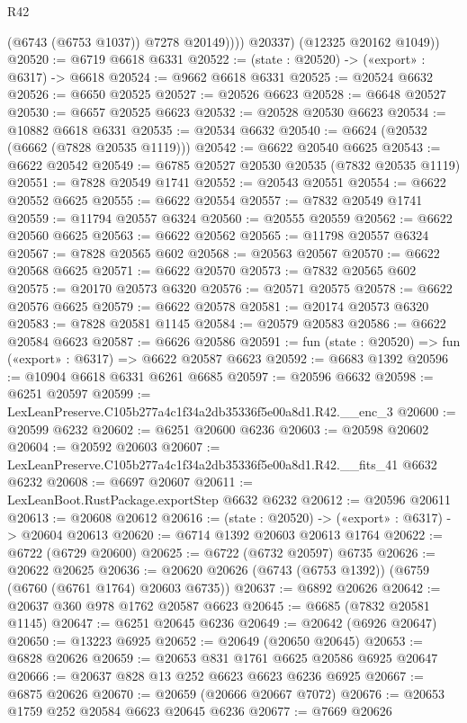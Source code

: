\begin{lexlean}{R42}
\begin{coremodule}
{                (@6743 (@6753 @1037))
                @7278
                @20149))))
        @20337)
      (@12325 @20162 @1049))
@20520 := @6719 @6618 @6331
@20522 := (state : @20520) -> («export» : @6317) -> @6618
@20524 := @9662 @6618 @6331
@20525 := @20524 @6632
@20526 := @6650 @20525
@20527 := @20526 @6623
@20528 := @6648 @20527
@20530 := @6657 @20525 @6623
@20532 := @20528 @20530 @6623
@20534 := @10882 @6618 @6331
@20535 := @20534 @6632
@20540 := @6624 (@20532 (@6662 (@7828 @20535 @1119)))
@20542 := @6622 @20540 @6625
@20543 := @6622 @20542
@20549 := @6785 @20527 @20530 @20535 (@7832 @20535 @1119)
@20551 := @7828 @20549 @1741
@20552 := @20543 @20551
@20554 := @6622 @20552 @6625
@20555 := @6622 @20554
@20557 := @7832 @20549 @1741
@20559 := @11794 @20557 @6324
@20560 := @20555 @20559
@20562 := @6622 @20560 @6625
@20563 := @6622 @20562
@20565 := @11798 @20557 @6324
@20567 := @7828 @20565 @602
@20568 := @20563 @20567
@20570 := @6622 @20568 @6625
@20571 := @6622 @20570
@20573 := @7832 @20565 @602
@20575 := @20170 @20573 @6320
@20576 := @20571 @20575
@20578 := @6622 @20576 @6625
@20579 := @6622 @20578
@20581 := @20174 @20573 @6320
@20583 := @7828 @20581 @1145
@20584 := @20579 @20583
@20586 := @6622 @20584 @6623
@20587 := @6626 @20586
@20591 := fun (state : @20520) => fun («export» : @6317) => @6622 @20587 @6623
@20592 := @6683 @1392
@20596 := @10904 @6618 @6331 @6261 @6685
@20597 := @20596 @6632
@20598 := @6251 @20597
@20599 := LexLeanPreserve.C105b277a4c1f34a2db35336f5e00a8d1.R42.__enc_3
@20600 := @20599 @6232
@20602 := @6251 @20600 @6236
@20603 := @20598 @20602
@20604 := @20592 @20603
@20607 := LexLeanPreserve.C105b277a4c1f34a2db35336f5e00a8d1.R42.__fits_41 @6632 @6232
@20608 := @6697 @20607
@20611 := LexLeanBoot.RustPackage.exportStep @6632 @6232
@20612 := @20596 @20611
@20613 := @20608 @20612
@20616 := (state : @20520) -> («export» : @6317) -> @20604 @20613
@20620 := @6714 @1392 @20603 @20613 @1764
@20622 := @6722 (@6729 @20600)
@20625 := @6722 (@6732 @20597) @6735
@20626 := @20622 @20625
@20636 := @20620 @20626 (@6743 (@6753 @1392)) (@6759 (@6760 (@6761 @1764) @20603 @6735))
@20637 := @6892 @20626
@20642 := @20637 @360 @978 @1762 @20587 @6623
@20645 := @6685 (@7832 @20581 @1145)
@20647 := @6251 @20645 @6236
@20649 := @20642 (@6926 @20647)
@20650 := @13223 @6925
@20652 := @20649 (@20650 @20645)
@20653 := @6828 @20626
@20659 := @20653 @831 @1761 @6625 @20586 @6925 @20647
@20666 := @20637 @828 @13 @252 @6623 @6623 @6236 @6925
@20667 := @6875 @20626
@20670 := @20659 (@20666 @20667 @7072)
@20676 := @20653 @1759 @252 @20584 @6623 @20645 @6236
@20677 := @7669 @20626
}
\end{coremodule}
\end{lexlean}
